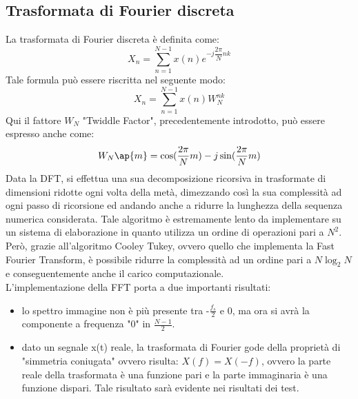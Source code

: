 \documentclass[a4paper, titlepage]{article}
\begin{document}
\subsection{Trasformata di Fourier discreta} %
La trasformata di Fourier discreta è definita come:
\begin{equation}
X_n= \sum_{n=1}^{N-1} x(n)e^{-j\dfrac{2\pi}{N}nk}
\end{equation}
Tale formula può essere riscritta nel seguente modo:
\begin{equation}
X_n= \sum_{n=1}^{N-1} x(n)W_N^{nk}
\end{equation}
Qui il fattore $W_N$ "Twiddle Factor", precedentemente introdotto, può essere espresso anche come:
\begin{equation}
    W_N\ap{m}=\cos(\dfrac{2\pi}{N}m) -j\sin(\dfrac{2\pi}{N}m)
\end{equation}
Data la DFT, si effettua una sua decomposizione ricorsiva in trasformate di dimensioni ridotte ogni volta della metà, dimezzando così la sua complessità ad ogni passo di ricorsione ed andando anche a ridurre la lunghezza della sequenza numerica considerata.
Tale algoritmo è estremamente lento da implementare su un sistema di elaborazione in quanto utilizza un ordine di operazioni pari a $N^2$. Però, grazie all'algoritmo Cooley Tukey, ovvero quello che implementa la Fast Fourier Transform, è possibile ridurre la complessità ad un ordine pari a $N\log_2 N$ e conseguentemente anche il carico computazionale.\\L'implementazione della FFT porta a due importanti risultati:
\begin{itemize}
    \item lo spettro immagine non è più presente tra -$\frac{f_s}{2}$ e 0, ma ora si avrà la componente a frequenza "0" in $\frac{N-1}{2}$.
    \item dato un segnale x(t) reale, la trasformata di Fourier gode della proprietà di "simmetria coniugata" ovvero risulta:
    $X(f)=X(-f)$, ovvero la parte reale della trasformata è una funzione pari e la parte immaginaria è una funzione dispari. Tale risultato sarà evidente nei risultati dei test.
\end{itemize}
\end{document}
